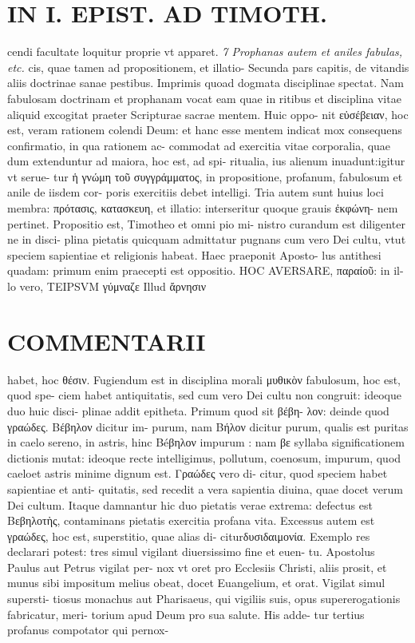 \documentclass{article}
\begin{document}
\begin{pages}
\section*{IN I. EPIST. AD TIMOTH. }
\marginpar{[ p.95 ]}\pstart cendi facultate loquitur proprie vt apparet.  \pend
\textit{7 Prophanas autem et aniles fabulas, etc. }\pstart cis, quae tamen ad propositionem, et illatio- Secunda pars capitis, de vitandis aliis doctrinae sanae pestibus. Imprimis quoad dogmata disciplinae spectat. Nam fabulosam doctrinam et prophanam vocat eam quae in ritibus et disciplina vitae aliquid excogitat praeter Scripturae sacrae mentem. Huic oppo- nit εὐσέβειαν, hoc est, veram rationem colendi Deum: et hanc esse mentem indicat mox consequens confirmatio, in qua rationem ac- commodat ad exercitia vitae corporalia, quae dum extenduntur ad maiora, hoc est, ad spi- ritualia, ius alienum inuadunt:igitur vt serue- tur ἡ γνώμη τοῦ συγγράμματος, in propositione, profanum, fabulosum et anile de iisdem cor- poris exercitiis debet intelligi. Tria autem sunt huius loci membra: πρότασις, κατασκευη, et illatio: interseritur quoque grauis ἐκφώνη- nem pertinet.  \pend\pstart Propositio est, Timotheo et omni pio mi- nistro curandum est diligenter ne in disci- plina pietatis quicquam admittatur pugnans cum vero Dei cultu, vtut speciem sapientiae et religionis habeat. Haec praeponit Aposto- lus antithesi quadam: primum enim praecepti est oppositio. HOC AVERSARE, παραίοῦ: in il- lo vero, TEIPSVM γύμναζε Illud ἄρνησιν  \pend
\marginpar{[ p.96 ]}
\section*{COMMENTARII }\pstart habet, hoc θέσιν. Fugiendum est in disciplina morali μυθικὸν fabulosum, hoc est, quod spe- ciem habet antiquitatis, sed cum vero Dei cultu non congruit: ideoque duo huic disci- plinae addit epitheta. Primum quod sit βέβη- λον: deinde quod γραώδες. Βέβηλον dicitur im- purum, nam Βήλον dicitur purum, qualis est puritas in caelo sereno, in astris, hinc Béβηλον impurum : nam βε syllaba significationem dictionis mutat: ideoque recte intelligimus, pollutum, coenosum, impurum, quod caeloet astris minime dignum est. Γραώδες vero di- citur, quod speciem habet sapientiae et anti- quitatis, sed recedit a vera sapientia diuina, quae docet verum Dei cultum.  \pend\pstart Itaque damnantur hic duo pietatis verae extrema: defectus est Bεβηλοτὴς, contaminans pietatis exercitia profana vita. Excessus autem est γραώδες, hoc est, superstitio, quae alias di- citurδυσιδαιμονία. Exemplo res declarari potest: tres simul vigilant diuersissimo fine et euen- tu. Apostolus Paulus aut Petrus vigilat per- nox vt oret pro Ecclesiis Christi, aliis prosit, et munus sibi impositum melius obeat, docet Euangelium, et orat. Vigilat simul supersti- tiosus monachus aut Pharisaeus, qui vigiliis suis, opus supererogationis fabricatur, meri- torium apud Deum pro sua salute. His adde- tur tertius profanus compotator qui pernox-  \pend

\end{pages}
\end{document}
